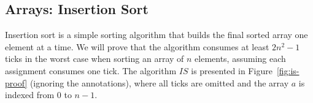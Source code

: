 \subsection{Arrays: Insertion Sort}

Insertion sort is a simple sorting algorithm that builds the final sorted array one element at a time. We will prove that the algorithm consumes at least $2n^2-1$ ticks in the worst case when sorting an array of $n$ elements, assuming each assignment consumes one tick. The algorithm $IS$ is presented in Figure~\ref{fig:is-proof} (ignoring the annotations), where all ticks are omitted and the array $a$ is indexed from $0$ to $n-1$.


